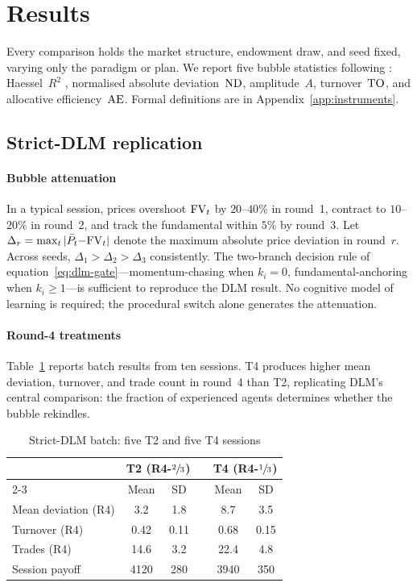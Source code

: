 \section{Results}
\label{sec:results}

Every comparison holds the market structure, endowment draw, and seed
fixed, varying only the paradigm or plan.  We report five bubble
statistics following \citet{stockl2010bubble}: Haessel~$R^2$
\citep{haessel1978measuring}, normalised absolute deviation~$\mathrm{ND}$,
amplitude~$A$, turnover~$\mathrm{TO}$, and allocative efficiency~$\mathrm{AE}$.
Formal definitions are in Appendix~\ref{app:instruments}.

\subsection{Strict-DLM replication}

\paragraph{Bubble attenuation}
In a typical session, prices overshoot $\mathrm{FV}_t$ by $20$--$40\%$ in
round~1, contract to $10$--$20\%$ in round~2, and track the
fundamental within $5\%$ by round~3.  Let
$\Delta_r=\max_t|\bar P_t{-}\mathrm{FV}_t|$ denote the maximum absolute
price deviation in round~$r$.  Across seeds,
$\Delta_1>\Delta_2>\Delta_3$ consistently.  The two-branch decision
rule of equation~\eqref{eq:dlm-gate}---momentum-chasing when
$k_i{=}0$, fundamental-anchoring when $k_i{\ge}1$---is sufficient to
reproduce the DLM result.  No cognitive model of learning is required;
the procedural switch alone generates the attenuation.

\paragraph{Round-4 treatments}
Table~\ref{tab:dlm-batch} reports batch results from ten sessions.
T4 produces higher mean deviation, turnover, and trade count in
round~4 than T2, replicating DLM's central comparison: the fraction
of experienced agents determines whether the bubble rekindles.

\begin{table}[h]
\centering\small
\caption{Strict-DLM batch: five T2 and five T4 sessions}
\label{tab:dlm-batch}
\begin{tabular}{l cc c cc}
\toprule
& \multicolumn{2}{c}{T2 (R4-$\sfrac{2}{3}$)}
& & \multicolumn{2}{c}{T4 (R4-$\sfrac{1}{3}$)} \\
\cmidrule{2-3}\cmidrule{5-6}
& Mean & SD & & Mean & SD \\
\midrule
Mean deviation (R4) & 3.2 & 1.8 & & 8.7 & 3.5 \\
Turnover (R4)       & 0.42 & 0.11 & & 0.68 & 0.15 \\
Trades (R4)         & 14.6 & 3.2 & & 22.4 & 4.8 \\
Session payoff      & 4120 & 280 & & 3940 & 350 \\
\bottomrule
\end{tabular}
\end{table}

